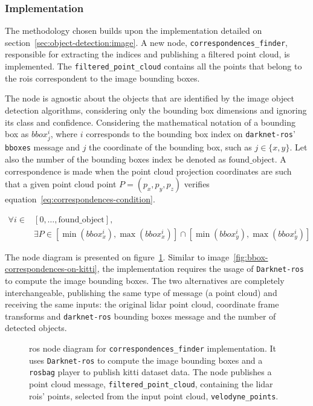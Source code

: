\subsubsection{Implementation}
The methodology chosen builds upon the implementation detailed on section~\ref{sec:object-detection:image}. A new node, \texttt{correspondences\_finder}, responsible for extracting the indices and  publishing a filtered point cloud, is implemented. The \texttt{filtered\_point\_cloud} contains all the points that belong to the \acp{roi} correspondent to the image bounding boxes. 

The node is agnostic about the objects that are identified by the image object detection algorithms, considering only the bounding box dimensions and ignoring its class and confidence. Considering the mathematical notation of a bounding box as $bbox^i_j$, where $i$ corresponds to the bounding box index on \texttt{darknet-ros}' \texttt{bboxes} message and $j$ the coordinate of the bounding box, such as $j \in \{x, y\}$. Let also the number of the bounding boxes index be denoted as $\text{found\_object}$. A correspondence is made when the point cloud projection coordinates are such that a given point cloud point $P = (p_x, p_y,p_z)$ verifies equation~\eqref{eq:correspondences-condition}.

\begin{align}
	\label{eq:correspondences-condition}
	\forall i \in & [0, \ldots, \text{found\_object}], \nonumber \\ 
			& \exists P \in [\min(bbox^i_x), \max(bbox^i_x)] \cap [\min(bbox^i_y), \max(bbox^i_y)] 
\end{align}

The node diagram is presented on figure~\ref{fig:correspondences-finder-standalone}. Similar to image~\ref{fig:bbox-correspondences-on-kitti}, the implementation requires the usage of \texttt{Darknet-ros} to compute the image bounding boxes. The two alternatives are completely interchangeable, publishing the same type of message (a point cloud) and receiving the same inputs: the original \ac{lidar} point cloud, coordinate frame transforms and \texttt{darknet-ros} bounding boxes message and the number of detected objects.

\begin{figure}[!ht]
	\centering
	\def\svgwidth{\columnwidth}
	\graphicspath{{img/image-object-to-point-cloud/}}
		
	\caption{\ac{ros} node diagram for \texttt{correspondences\_finder} implementation. It uses \texttt{Darknet-ros} to compute the image bounding boxes and a \texttt{rosbag} player to publish \ac{kitti} dataset data. The node publishes a point cloud message, \texttt{filtered\_point\_cloud}, containing the \ac{lidar} \acp{roi}' points, selected from the input point cloud, \texttt{velodyne\_points}.}
	\label{fig:correspondences-finder-standalone}
\end{figure}

